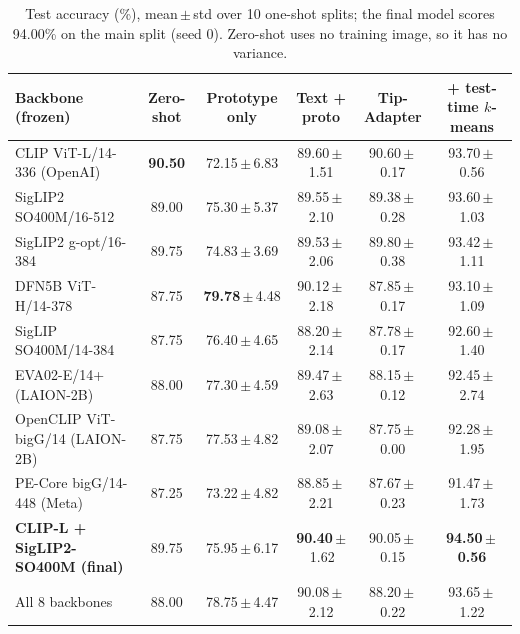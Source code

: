 \documentclass[10pt]{article}
\begin{document}
\begin{table}[h]
\centering\small
\setlength{\tabcolsep}{4pt}
\begin{tabular}{lccccc}
\toprule
Backbone (frozen) & Zero-shot & Prototype only & Text + proto & Tip-Adapter & \textbf{+ test-time $k$-means} \\
\midrule
CLIP ViT-L/14-336 (OpenAI) & \textbf{90.50} & 72.15\,$\pm$\,6.83 & 89.60\,$\pm$\,1.51 & 90.60\,$\pm$\,0.17 & 93.70\,$\pm$\,0.56 \\
SigLIP2 SO400M/16-512 & 89.00 & 75.30\,$\pm$\,5.37 & 89.55\,$\pm$\,2.10 & 89.38\,$\pm$\,0.28 & 93.60\,$\pm$\,1.03 \\
SigLIP2 g-opt/16-384 & 89.75 & 74.83\,$\pm$\,3.69 & 89.53\,$\pm$\,2.06 & 89.80\,$\pm$\,0.38 & 93.42\,$\pm$\,1.11 \\
DFN5B ViT-H/14-378 & 87.75 & \textbf{79.78}\,$\pm$\,4.48 & 90.12\,$\pm$\,2.18 & 87.85\,$\pm$\,0.17 & 93.10\,$\pm$\,1.09 \\
SigLIP SO400M/14-384 & 87.75 & 76.40\,$\pm$\,4.65 & 88.20\,$\pm$\,2.14 & 87.78\,$\pm$\,0.17 & 92.60\,$\pm$\,1.40 \\
EVA02-E/14+ (LAION-2B) & 88.00 & 77.30\,$\pm$\,4.59 & 89.47\,$\pm$\,2.63 & 88.15\,$\pm$\,0.12 & 92.45\,$\pm$\,2.74 \\
OpenCLIP ViT-bigG/14 (LAION-2B) & 87.75 & 77.53\,$\pm$\,4.82 & 89.08\,$\pm$\,2.07 & 87.75\,$\pm$\,0.00 & 92.28\,$\pm$\,1.95 \\
PE-Core bigG/14-448 (Meta) & 87.25 & 73.22\,$\pm$\,4.82 & 88.85\,$\pm$\,2.21 & 87.67\,$\pm$\,0.23 & 91.47\,$\pm$\,1.73 \\
\midrule
\textbf{CLIP-L + SigLIP2-SO400M (final)} & 89.75 & 75.95\,$\pm$\,6.17 & \textbf{90.40}\,$\pm$\,1.62 & 90.05\,$\pm$\,0.15 & \textbf{94.50\,$\pm$\,0.56} \\
All 8 backbones & 88.00 & 78.75\,$\pm$\,4.47 & 90.08\,$\pm$\,2.12 & 88.20\,$\pm$\,0.22 & 93.65\,$\pm$\,1.22 \\
\bottomrule
\end{tabular}
\caption{Test accuracy (\%), mean\,$\pm$\,std over 10 one-shot splits; the final model scores 94.00\% on the main split (seed 0). Zero-shot uses no training image, so it has no variance.}
\label{tab:main}
\vspace{-6pt}
\end{table}
\end{document}
